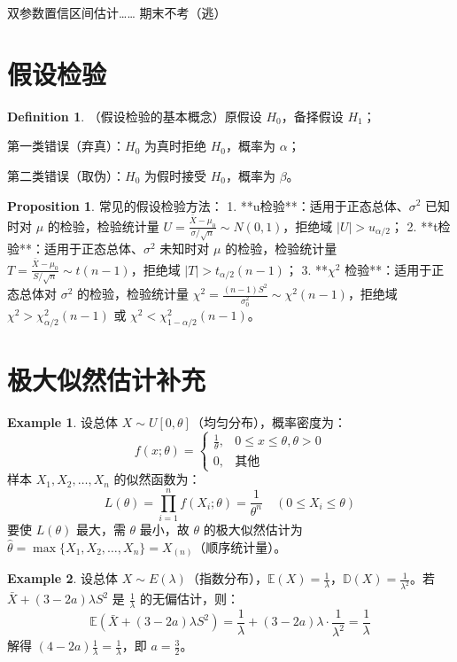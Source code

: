 \documentclass[oneside]{book}
\theoremstyle{definition}
\newtheorem{example}{Example}[section]
\newtheorem{proposition}{Proposition}[section]
\newtheorem{definition}{Definition}[section]
\begin{document}
	双参数置信区间估计……	期末不考（逃）
	
	
	\section{假设检验}
	
	\begin{definition}
		（假设检验的基本概念）原假设 \( H_0 \)，备择假设 \( H_1 \)；
		
		第一类错误（弃真）：\( H_0 \) 为真时拒绝 \( H_0 \)，概率为 \( \alpha \)；
		
		第二类错误（取伪）：\( H_0 \) 为假时接受 \( H_0 \)，概率为 \( \beta \)。
	\end{definition}
	
	\begin{proposition}
		常见的假设检验方法：
		1. **u检验**：适用于正态总体、\( \sigma^2 \) 已知时对 \( \mu \) 的检验，检验统计量 \( U = \frac{\bar{X} - \mu_0}{\sigma/\sqrt{n}} \sim N(0,1) \)，拒绝域 \( |U| > u_{\alpha/2} \)；
		2. **t检验**：适用于正态总体、\( \sigma^2 \) 未知时对 \( \mu \) 的检验，检验统计量 \( T = \frac{\bar{X} - \mu_0}{S/\sqrt{n}} \sim t(n-1) \)，拒绝域 \( |T| > t_{\alpha/2}(n-1) \)；
		3. **\( \chi^2 \) 检验**：适用于正态总体对 \( \sigma^2 \) 的检验，检验统计量 \( \chi^2 = \frac{(n-1)S^2}{\sigma_0^2} \sim \chi^2(n-1) \)，拒绝域 \( \chi^2 > \chi^2_{\alpha/2}(n-1) \) 或 \( \chi^2 < \chi^2_{1-\alpha/2}(n-1) \)。
	\end{proposition}
	
	\section{极大似然估计补充}
	
	\begin{example}
		设总体 \( X \sim U[0,\theta] \)（均匀分布），概率密度为：
		\[
		f(x;\theta) = \begin{cases}
			\frac{1}{\theta}, & 0 \leq x \leq \theta, \theta > 0 \\
			0, & \text{其他}
		\end{cases}
		\]
		样本 \( X_1,X_2,\dots,X_n \) 的似然函数为：
		\[
		L(\theta) = \prod_{i=1}^n f(X_i;\theta) = \frac{1}{\theta^n} \quad (0 \leq X_i \leq \theta)
		\]
		要使 \( L(\theta) \) 最大，需 \( \theta \) 最小，故 \( \theta \) 的极大似然估计为 \( \hat{\theta} = \max\{X_1,X_2,\dots,X_n\} = X_{(n)} \)（顺序统计量）。
	\end{example}
	
	\begin{example}
		设总体 \( X \sim E(\lambda) \)（指数分布），\( \mathbb{E}(X) = \frac{1}{\lambda} \)，\( \mathbb{D}(X) = \frac{1}{\lambda^2} \)。若 \( \bar{X} + (3-2a)\lambda S^2 \) 是 \( \frac{1}{\lambda} \) 的无偏估计，则：
		\[
		\mathbb{E}\left( \bar{X} + (3-2a)\lambda S^2 \right) = \frac{1}{\lambda} + (3-2a)\lambda \cdot \frac{1}{\lambda^2} = \frac{1}{\lambda}
		\]
		解得 \( (4-2a)\frac{1}{\lambda} = \frac{1}{\lambda} \)，即 \( a = \frac{3}{2} \)。
	\end{example}
	
\end{document}
